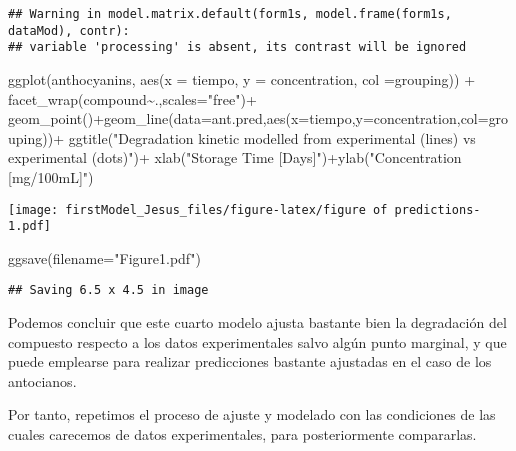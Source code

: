 \documentclass[
]{article}
\newenvironment{Shaded}{\begin{snugshade}}{\end{snugshade}}
\newcommand{\AttributeTok}[1]{\textcolor[rgb]{0.77,0.63,0.00}{#1}}
\newcommand{\FunctionTok}[1]{\textcolor[rgb]{0.00,0.00,0.00}{#1}}
\newcommand{\NormalTok}[1]{#1}
\newcommand{\SpecialCharTok}[1]{\textcolor[rgb]{0.00,0.00,0.00}{#1}}
\newcommand{\StringTok}[1]{\textcolor[rgb]{0.31,0.60,0.02}{#1}}
\begin{document}
\begin{verbatim}
## Warning in model.matrix.default(form1s, model.frame(form1s, dataMod), contr):
## variable 'processing' is absent, its contrast will be ignored
\end{verbatim}

\begin{Shaded}
\begin{Highlighting}[]
\FunctionTok{ggplot}\NormalTok{(anthocyanins, }
       \FunctionTok{aes}\NormalTok{(}\AttributeTok{x =}\NormalTok{ tiempo, }\AttributeTok{y =}\NormalTok{ concentration, }\AttributeTok{col =}\NormalTok{grouping)) }\SpecialCharTok{+}
  \FunctionTok{facet\_wrap}\NormalTok{(compound}\SpecialCharTok{\textasciitilde{}}\NormalTok{.,}\AttributeTok{scales=}\StringTok{"free"}\NormalTok{)}\SpecialCharTok{+}
  \FunctionTok{geom\_point}\NormalTok{()}\SpecialCharTok{+}\FunctionTok{geom\_line}\NormalTok{(}\AttributeTok{data=}\NormalTok{ant.pred,}\FunctionTok{aes}\NormalTok{(}\AttributeTok{x=}\NormalTok{tiempo,}\AttributeTok{y=}\NormalTok{concentration,}\AttributeTok{col=}\NormalTok{grouping))}\SpecialCharTok{+}
  \FunctionTok{ggtitle}\NormalTok{(}\StringTok{"Degradation kinetic modelled from experimental (lines) vs experimental (dots)"}\NormalTok{)}\SpecialCharTok{+}
  \FunctionTok{xlab}\NormalTok{(}\StringTok{"Storage Time [Days]"}\NormalTok{)}\SpecialCharTok{+}\FunctionTok{ylab}\NormalTok{(}\StringTok{"Concentration [mg/100mL]"}\NormalTok{)}
\end{Highlighting}
\end{Shaded}

\texttt{[image: firstModel\_Jesus\_files/figure-latex/figure of predictions-1.pdf]}

\begin{Shaded}
\begin{Highlighting}[]
\FunctionTok{ggsave}\NormalTok{(}\AttributeTok{filename=}\StringTok{"Figure1.pdf"}\NormalTok{)}
\end{Highlighting}
\end{Shaded}

\begin{verbatim}
## Saving 6.5 x 4.5 in image
\end{verbatim}

Podemos concluir que este cuarto modelo ajusta bastante bien la
degradación del compuesto respecto a los datos experimentales salvo
algún punto marginal, y que puede emplearse para realizar predicciones
bastante ajustadas en el caso de los antocianos.

Por tanto, repetimos el proceso de ajuste y modelado con las condiciones
de las cuales carecemos de datos experimentales, para posteriormente
compararlas.
\end{document}
